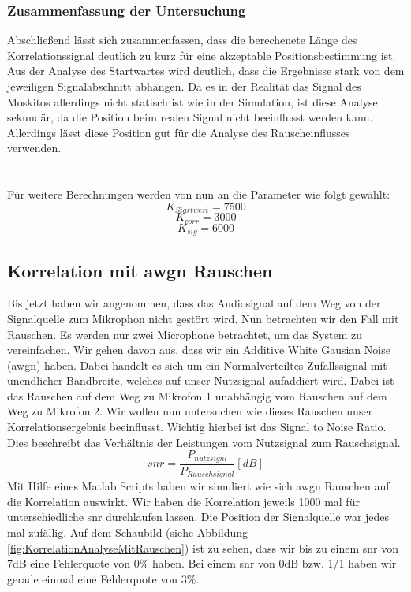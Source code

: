 \subsubsection{Zusammenfassung der Untersuchung }
Abschließend lässt sich zusammenfassen, dass die berechenete Länge des Korrelationssignal deutlich zu kurz für eine akzeptable Positionsbestimmung ist. Aus der Analyse des Startwartes wird deutlich, dass die Ergebnisse stark von dem jeweiligen Signalabschnitt abhängen. Da es in der Realität das Signal des Moskitos allerdings nicht statisch ist wie in der Simulation, ist diese Analyse sekundär, da die Position beim realen Signal nicht beeinflusst werden kann. Allerdings lässt diese Position gut für die Analyse des Rauscheinflusses verwenden. \\\\\\
Für weitere Berechnungen werden von nun an die Parameter wie folgt gewählt:\\
$$K_{Startwert} = 7500$$
$$K_{corr} = 3000$$
$$K_{sig} = 6000$$

\subsection{Korrelation mit awgn Rauschen }
Bis jetzt haben wir angenommen, dass das Audiosignal auf dem Weg von der Signalquelle zum Mikrophon nicht gestört wird. Nun betrachten wir den Fall mit Rauschen. Es werden nur zwei Microphone betrachtet, um das System zu vereinfachen. Wir gehen davon aus, dass wir ein Additive White Gausian Noise (awgn) haben. Dabei handelt es sich um ein Normalverteiltes Zufallssignal mit unendlicher Bandbreite, welches auf unser Nutzsignal aufaddiert wird. Dabei ist das Rauschen auf dem Weg zu Mikrofon 1 unabhängig vom Rauschen auf dem Weg zu Mikrofon 2. Wir wollen nun untersuchen wie dieses Rauschen unser Korrelationsergebnis beeinflusst. Wichtig hierbei ist das Signal to Noise Ratio. Dies beschreibt das Verhältnis der Leistungen vom Nutzsignal zum Rauschsignal. 
$$ snr = \frac{P_{nutzsignl}}{P_{Rauschsignal}} [dB]$$
Mit Hilfe eines Matlab Scripts haben wir simuliert wie sich awgn Rauschen auf die Korrelation auswirkt. Wir haben die Korrelation jeweils 1000 mal für unterschiedliche snr durchlaufen lassen. Die Position der Signalquelle war jedes mal zufällig. Auf dem Schaubild (siehe Abbildung \ref{fig:KorrelationAnalyseMitRauschen}) ist zu sehen, dass wir bis zu einem snr von 7dB eine Fehlerquote von 0\% haben. Bei einem snr von 0dB bzw. 1/1 haben wir gerade einmal eine Fehlerquote von 3\%.




